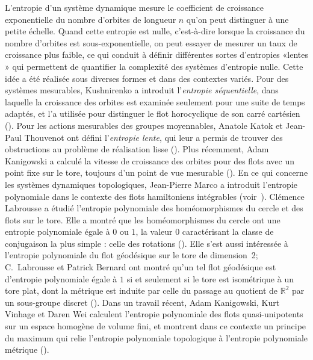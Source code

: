 \documentclass[11pt]{article}
\providecommand{\og}{«\nobreakspace}
\providecommand{\fg}{\nobreakspace»}
\theoremstyle{definition}
\numberwithin{equation}{section}
\numberwithin{figure}{section}
\numberwithin{table}{section}
\begin{document}
L'entropie d'un système dynamique mesure le coefficient de croissance exponentielle du nombre d'orbites de longueur $n$ qu'on peut distinguer à une petite échelle. Quand cette entropie est nulle, c'est-à-dire lorsque la croissance du nombre d'orbites est sous-exponentielle, on peut essayer de mesurer un taux de croissance plus faible, ce qui conduit à définir différentes sortes d'entropies \og lentes \fg{} qui permettent de quantifier la complexité des systèmes d'entropie nulle. Cette idée a été réalisée sous diverses formes et dans des contextes variés. Pour des systèmes mesurables, Kushnirenko a introduit l'\emph{entropie séquentielle}, dans laquelle la croissance des orbites est examinée seulement pour une suite de temps adaptés, et l'a utilisée pour distinguer le flot horocyclique de son carré cartésien (\cite{Kus67}). Pour les actions mesurables des groupes moyennables, Anatole Katok et Jean-Paul Thouvenot ont défini l'\emph{entropie lente}, qui leur a permis de trouver des obstructions au problème de réalisation lisse (\cite{KatTho97}). Plus récemment, Adam Kanigowski a calculé la vitesse de croissance des orbites pour des flots avec un point fixe sur le tore, toujours d'un point de vue mesurable (\cite{Kan18}). En ce qui concerne les systèmes dynamiques topologiques, Jean-Pierre Marco a introduit l'entropie polynomiale dans le contexte des flots hamiltoniens intégrables (voir~\cite{Mar13}). Clémence Labrousse a étudié l'entropie polynomiale des homéomorphismes du cercle et des flots sur le tore. Elle a montré que les homéomorphismes du cercle ont une entropie polynomiale égale à $0$ ou $1$, la valeur $0$ caractérisant la classe de conjugaison la plus simple : celle des rotations (\cite{Lab13}). Elle s'est aussi intéressée à l'entropie polynomiale du flot géodésique sur le tore de dimension~2; C.~Labrousse et Patrick Bernard ont montré qu'un tel flot géodésique est d'entropie polynomiale égale à $1$ si et seulement si le tore est isométrique à un tore plat, dont la métrique est induite par celle du passage au quotient de $\mathbb R^2$ par un sous-groupe discret (\cite{BerLab16}). Dans un travail récent, Adam Kanigowski, Kurt Vinhage et Daren Wei calculent l'entropie polynomiale des flots quasi-unipotents sur un espace homogène de volume fini, et montrent dans ce contexte un principe du maximum qui relie l'entropie polynomiale topologique à l'entropie polynomiale métrique (\cite{KVW18}).
\end{document}
